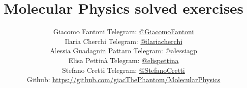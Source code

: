 \documentclass[10pt]{article}
\title{\Huge \textbf{Molecular Physics solved exercises}}
\author{
  Giacomo Fantoni\qquad\qquad\qquad\qquad\quad
  \small Telegram: \href{https://t.me/GiacomoFantoni}{@GiacomoFantoni} \\[3pt]
  Ilaria Cherchi\qquad\qquad\qquad\qquad\quad
  \small Telegram: \href{https://t.me/ilariacherchi}{@ilariacherchi} \\[3pt]
  Alessia Guadagnin Pattaro\qquad
  \small Telegram: \href{https://t.me/alessiagp}{@alessiagp} \\[3pt]
  Elisa Pettin\`a\qquad\qquad\qquad\qquad\quad
  \small Telegram: \href{https://t.me/elisapettina}{@elispettina} \\[3pt]
  Stefano Cretti\qquad\qquad\qquad\qquad\quad
  \small Telegram: \href{https://t.me/StefanoCretti}{@StefanoCretti} \\[3pt]
\small Github: \href{https://github.com/giacThePhantom/MolecularPhysics}{https://github.com/giacThePhantom/MolecularPhysics}}
\begin{document}
  \maketitle
  \tableofcontents
  \graphicspath{{solved_exercises/exercises_images/}}

  
  
  
  
  
  
\end{document}
